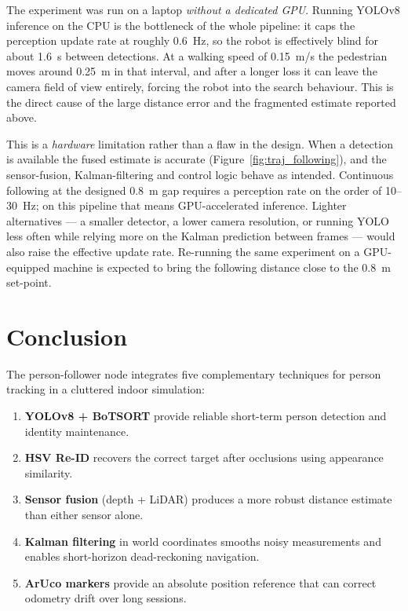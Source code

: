 \documentclass[12pt,a4paper]{article}
\begin{document}
The experiment was run on a laptop \emph{without a dedicated GPU}. Running
YOLOv8 inference on the CPU is the bottleneck of the whole pipeline: it caps
the perception update rate at roughly 0.6~Hz, so the robot is effectively
blind for about 1.6~s between detections. At a walking speed of 0.15~m/s the
pedestrian moves around 0.25~m in that interval, and after a longer loss it
can leave the camera field of view entirely, forcing the robot into the
search behaviour. This is the direct cause of the large distance error and
the fragmented estimate reported above.

This is a \emph{hardware} limitation rather than a flaw in the design. When a
detection is available the fused estimate is accurate
(Figure~\ref{fig:traj_following}), and the sensor-fusion, Kalman-filtering and
control logic behave as intended. Continuous following at the designed 0.8~m
gap requires a perception rate on the order of 10--30~Hz; on this pipeline
that means GPU-accelerated inference. Lighter alternatives --- a smaller
detector, a lower camera resolution, or running YOLO less often while relying
more on the Kalman prediction between frames --- would also raise the
effective update rate. Re-running the same experiment on a GPU-equipped
machine is expected to bring the following distance close to the 0.8~m
set-point.


\section{Conclusion}

The person-follower node integrates five complementary techniques for person tracking
in a cluttered indoor simulation:

\begin{enumerate}
  \item \textbf{YOLOv8 + BoTSORT} provide reliable short-term person
    detection and identity maintenance.
  \item \textbf{HSV Re-ID} recovers the correct target after occlusions using
    appearance similarity.
  \item \textbf{Sensor fusion} (depth + LiDAR) produces a more robust
    distance estimate than either sensor alone.
  \item \textbf{Kalman filtering} in world coordinates smooths noisy
    measurements and enables short-horizon dead-reckoning navigation.
  \item \textbf{ArUco markers} provide an absolute position reference that
    can correct odometry drift over long sessions.
\end{enumerate}
\end{document}
